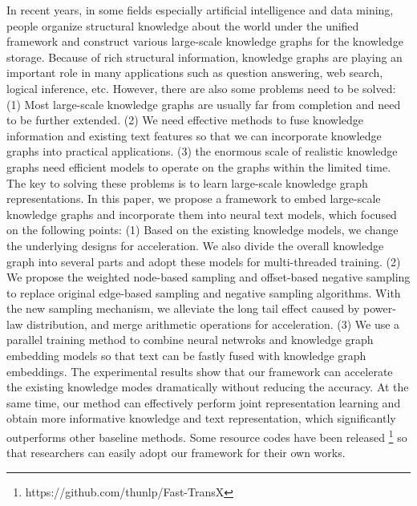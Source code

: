 \begin{eabstract}
   
   In recent years, in some fields especially artificial intelligence and data mining, people organize structural knowledge about the world under the unified framework and construct various large-scale knowledge graphs for the knowledge storage. Because of rich structural information, knowledge graphs are playing an important role in many applications such as question answering, web search, logical inference, etc. However, there are also some problems need to be solved: (1) Most large-scale knowledge graphs are usually far from completion and need to be further extended. (2) We need effective methods to fuse knowledge information and existing text features so that we can incorporate knowledge graphs into practical applications. (3) the enormous scale of realistic knowledge graphs need efficient models to operate on the graphs within the limited time. The key to solving these problems is to learn large-scale knowledge graph representations. In this paper, we propose a framework to embed large-scale knowledge graphs and incorporate them into neural text models, which focused on the following points: (1) Based on the existing knowledge models, we change the underlying designs for acceleration. We also divide the overall knowledge graph into several parts and adopt these models for multi-threaded training. (2) We propose the weighted node-based sampling and offset-based negative sampling to replace original edge-based sampling and negative sampling algorithms. With the new sampling mechanism, we alleviate the long tail effect caused by power-law distribution, and merge arithmetic operations for acceleration. (3) We use a parallel training method to combine neural netwroks and knowledge graph embedding models so that text can be fastly fused with knowledge graph embeddings. The experimental results show that our framework can accelerate the existing knowledge modes dramatically without reducing the accuracy. At the same time, our method can effectively perform joint representation learning and obtain more informative knowledge and text representation, which significantly outperforms other baseline methods. Some resource codes have been released \footnote{https://github.com/thunlp/Fast-TransX} so that researchers can easily adopt our framework for their own works.

\end{eabstract}

